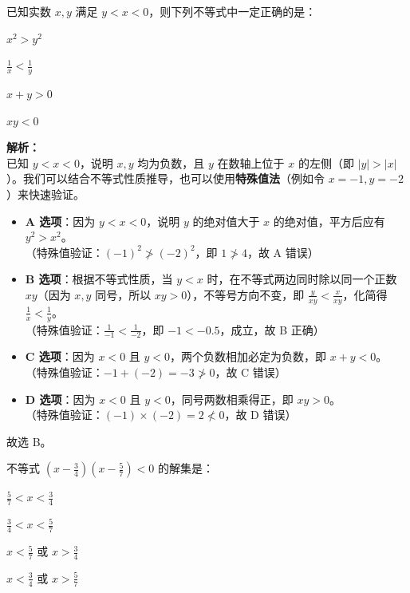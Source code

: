 \begin{question}
    已知实数 $x, y$ 满足 $y < x < 0$，则下列不等式中一定正确的是： \paren[B]
    \begin{choices}
        \item $x^2 > y^2$ 
        \item $\displaystyle \frac{1}{x} < \frac{1}{y}$ 
        \item $x + y > 0$ 
        \item $xy < 0$
    \end{choices}
\end{question}

\begin{solution}
    \textbf{解析：} \\
    已知 $y < x < 0$，说明 $x, y$ 均为负数，且 $y$ 在数轴上位于 $x$ 的左侧（即 $|y| > |x|$）。我们可以结合不等式性质推导，也可以使用\textbf{特殊值法}（例如令 $x = -1, y = -2$）来快速验证。

    \begin{itemize}
        \item \textbf{A 选项}：因为 $y < x < 0$，说明 $y$ 的绝对值大于 $x$ 的绝对值，平方后应有 $y^2 > x^2$。\\
        （特殊值验证：$(-1)^2 \ngtr (-2)^2$，即 $1 \ngtr 4$，故 A 错误）
        
        \item \textbf{B 选项}：根据不等式性质，当 $y < x$ 时，在不等式两边同时除以同一个正数 $xy$（因为 $x,y$ 同号，所以 $xy > 0$），不等号方向不变，即 $\frac{y}{xy} < \frac{x}{xy}$，化简得 $\frac{1}{x} < \frac{1}{y}$。\\
        （特殊值验证：$\frac{1}{-1} < \frac{1}{-2}$，即 $-1 < -0.5$，成立，故 B 正确）
        
        \item \textbf{C 选项}：因为 $x < 0$ 且 $y < 0$，两个负数相加必定为负数，即 $x + y < 0$。\\
        （特殊值验证：$-1 + (-2) = -3 \ngtr 0$，故 C 错误）
        
        \item \textbf{D 选项}：因为 $x < 0$ 且 $y < 0$，同号两数相乘得正，即 $xy > 0$。\\
        （特殊值验证：$(-1) \times (-2) = 2 \nless 0$，故 D 错误）
    \end{itemize}
    
    故选 B。
\end{solution}

\begin{question}
    不等式 $\displaystyle \left(x - \frac{3}{4}\right)\left(x - \frac{5}{7}\right) < 0$ 的解集是： \paren[A]
    \begin{choices}
        \item $\displaystyle \frac{5}{7} < x < \frac{3}{4}$ 
        \item $\displaystyle \frac{3}{4} < x < \frac{5}{7}$ 
        \item $\displaystyle x < \frac{5}{7}$ 或 $\displaystyle x > \frac{3}{4}$ 
        \item $\displaystyle x < \frac{3}{4}$ 或 $\displaystyle x > \frac{5}{7}$
    \end{choices}
\end{question}

